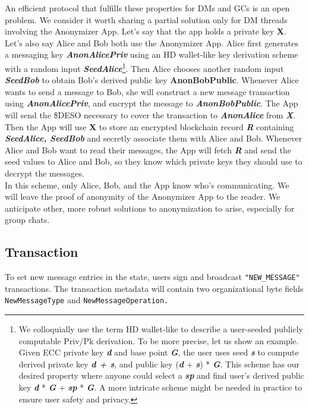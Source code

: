 \documentclass[oneside, 12pt]{article}
\newcommand{\fn}[1]{\footnote{\hangpara{1.4em}{1} #1}}
\begin{document}
\noindent An efficient protocol that fulfills these properties for DMs and GCs is an open problem. We consider it worth sharing a partial solution only for DM threads involving the Anonymizer App. Let’s say that the app holds a private key \textbf{X}. Let’s also say Alice and Bob both use the Anonymizer App. Alice first generates a messaging key \textbf{\textit{AnonAlicePriv}} using an HD wallet-like key derivation scheme with a random input \textbf{\textit{SeedAlice}}\fn{We colloquially use the term HD wallet-like to describe a user-seeded publicly computable Priv/Pk derivation. To be more precise, let us show an example. Given ECC private key \textbf{\textit{d}} and base point \textbf{\textit{G}}, the user uses seed \textbf{\textit{s}} to compute derived private key \textbf{\textit{d + s}}, and public key (\textbf{\textit{d}} + \textbf{\textit{s}}) * \textbf{\textit{G}}. This scheme has our desired property where anyone could select a \textbf{\textit{sp}} and find user’s derived public key \textbf{\textit{d}} * \textbf{\textit{G}} + \textbf{\textit{sp}} * \textbf{\textit{G}}. A more intricate scheme might be needed in practice to ensure user safety and privacy.}. Then Alice chooses another random input \textbf{\textit{SeedBob}} to obtain Bob’s derived public key \textbf{AnonBobPublic}. Whenever Alice wants to send a message to Bob, she will construct a new message transaction using \textbf{\textit{AnonAlicePriv}}, and encrypt the message to \textbf{\textit{AnonBobPublic}}. The App will send the \$DESO necessary to cover the transaction to \textbf{\textit{AnonAlice}} from \textbf{\textit{X}}. Then the App will use \textbf{X} to store an encrypted blockchain record \textbf{\textit{R}} containing \textbf{\textit{SeedAlice, SeedBob}} and secretly associate them with Alice and Bob. Whenever Alice and Bob want to read their messages, the App will fetch \textbf{\textit{R}} and send the seed values to Alice and Bob, so they know which private keys they should use to decrypt the messages.\\

\noindent In this scheme, only Alice, Bob, and the App know who’s communicating. We will leave the proof of anonymity of the Anonymizer App to the reader. We anticipate other, more robust solutions to anonymization to arise, especially for group chats.

\subsection{Transaction}
To set new message entries in the state, users sign and broadcast \texttt{"NEW\_MESSAGE"} transactions. The transaction metadata will contain two organizational byte fields \texttt{NewMessageType} and \texttt{NewMessageOperation.}
\end{document}
